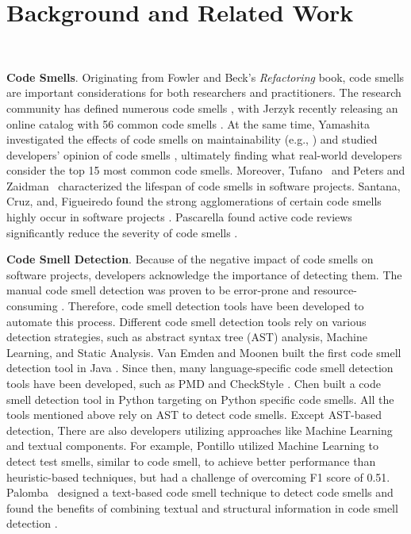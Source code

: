 \vspace*{-0.5em}

\section{Background and Related Work}~\label{sec:background}

\vspace*{-1em}


{\bf Code Smells}. Originating from Fowler and Beck's \textit{Refactoring}
book, code smells are important considerations for both researchers and
practitioners. The research community has defined numerous code smells
\cite{Pysmell,SQLAntipatterns,CleanCode,RefactoringWorkbook}, with Jerzyk
recently releasing an online catalog with 56 common code smells
\cite{Jerzyk2023}. At the same time, Yamashita investigated the effects of code
smells on maintainability (e.g., \cite{6392174, 6405287}) and studied
developers' opinion of code smells \cite{developersCare}, ultimately finding
what real-world developers consider the top 15 most common code smells.
Moreover, Tufano~\etal{} \cite{whenandwhy} and Peters and
Zaidman~\cite{lifespan} characterized the lifespan of code smells in software
projects. Santana, Cruz, and, Figueiredo found the strong agglomerations of
certain code smells highly occur in software projects \cite{Santana}.
Pascarella found active code reviews significantly reduce the severity of code
smells \cite{Pascarella}.

{\bf Code Smell Detection}. Because of the negative impact of code smells on
software projects, developers acknowledge the importance of detecting them. The
manual code smell detection was proven to be error-prone and resource-consuming
\cite{DetectingDefectsInObject}. Therefore, code smell detection tools have been
developed to automate this process. Different code smell detection tools rely on
various detection strategies, such as abstract syntax tree (AST) analysis,
Machine Learning, and Static Analysis. Van Emden and Moonen built the first code
smell detection tool in Java \cite{1173068}. Since then, many language-specific
code smell detection tools have been developed, such as PMD \cite{PMD} and
CheckStyle \cite{CheckStyle}. Chen \cite{Pysmell} built a code smell detection
tool in Python targeting on Python specific code smells. All the tools mentioned
above rely on AST to detect code smells. Except AST-based detection, There are
also developers utilizing approaches like Machine Learning and textual
components. For example, Pontillo utilized Machine Learning to detect test
smells, similar to code smell, to achieve better performance than
heuristic-based techniques, but had a challenge of overcoming F1 score of 0.51.
Palomba~\etal{} designed a text-based code smell technique to detect code smells
and found the benefits of combining textual and structural information in code
smell detection \cite{Palomba}.

